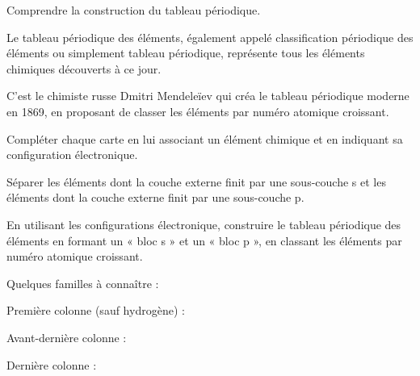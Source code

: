 \teteSndAtom



\begin{objectifs}
  \item Comprendre la construction du tableau périodique.
\end{objectifs}

\begin{contexte}
  Le tableau périodique des éléments, également appelé classification périodique des éléments ou simplement tableau périodique, représente tous les éléments chimiques découverts à ce jour.
  
 C'est le chimiste russe Dmitri Mendeleïev qui créa le tableau périodique moderne en 1869, en proposant de classer les éléments par numéro atomique croissant.

\end{contexte}


\mesure
Compléter chaque carte en lui associant un élément chimique et en indiquant sa configuration électronique.

\mesure
Séparer les éléments dont la couche externe finit par une sous-couche s et les éléments dont la couche externe finit par une sous-couche p.

\mesure
En utilisant les configurations électronique, construire le tableau périodique des éléments en formant un « bloc s » et un « bloc p », en classant les éléments par numéro atomique croissant.




\begin{encart}
  Quelques familles à connaître : 
  \begin{listePoints}
    \item Première colonne (sauf hydrogène) : 
    \item Avant-dernière colonne : 
    \item Dernière colonne : 
  \end{listePoints}
\end{encart}

